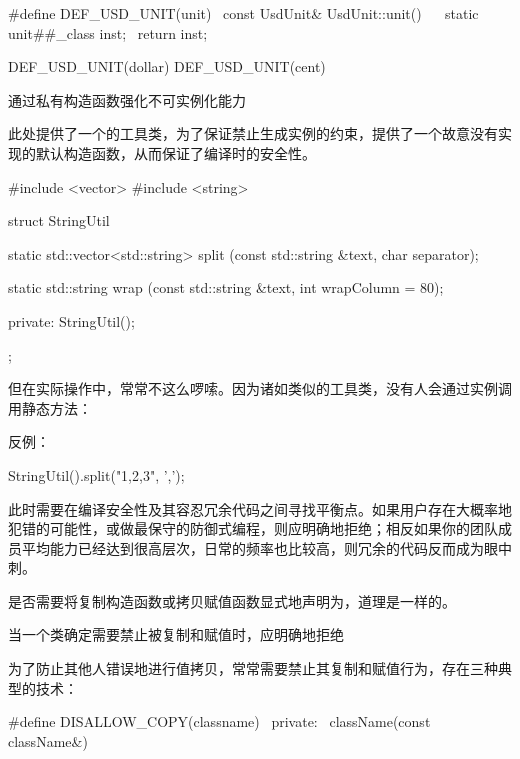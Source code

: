 \begin{content}
\begin{leftbar}
\begin{c++}
#define DEF_USD_UNIT(unit)             \
const UsdUnit& UsdUnit::unit()         \
{                                      \
    static unit##_class inst;          \
    return inst;                       \
}

DEF_USD_UNIT(dollar)
DEF_USD_UNIT(cent)
\end{c++}
\end{leftbar}

\begin{regulation}
通过私有构造函数强化不可实例化能力
\end{regulation}

此处提供了一个的工具类，为了保证禁止生成实例的约束，提供了一个故意没有实现的默认构造函数，从而保证了编译时的安全性。

\begin{leftbar}
\begin{c++}
#include <vector>
#include <string>

struct StringUtil
{
    static std::vector<std::string> split
        (const std::string &text, char separator);

    static std::string wrap
        (const std::string &text, int wrapColumn = 80);

private:
    StringUtil();
};
\end{c++}
\end{leftbar}

但在实际操作中，常常不这么啰嗦。因为诸如类似的工具类，没有人会通过实例调用静态方法：

反例：
\begin{leftbar}
\begin{c++}
StringUtil().split("1,2,3", ',');
\end{c++}
\end{leftbar}

此时需要在编译安全性及其容忍冗余代码之间寻找平衡点。如果用户存在大概率地犯错的可能性，或做最保守的防御式编程，则应明确地拒绝；相反如果你的团队成员平均能力已经达到很高层次，日常\ascii{Code Review}的频率也比较高，则冗余的代码反而成为眼中刺。

是否需要将复制构造函数或拷贝赋值函数显式地声明为\ascii{private}，道理是一样的。

\begin{regulation}
当一个类确定需要禁止被复制和赋值时，应明确地拒绝
\end{regulation}

为了防止其他人错误地进行值拷贝，常常需要禁止其复制和赋值行为，存在三种典型的技术：

\begin{leftbar}
\begin{c++}
#define DISALLOW_COPY(classname) \
private:                         \
    className(const className&)
    

\end{c++}
\end{leftbar}
\end{content}
